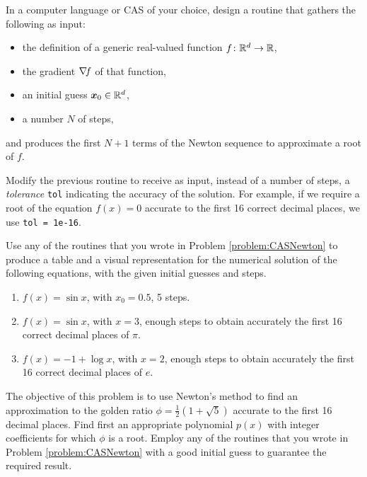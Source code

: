 \begin{problem}[CAS]\label{problem:CASNewton}
In a computer language or CAS of your choice, design a routine that gathers the following as input:
\begin{itemize}
\item the definition of a generic real-valued function $f\colon \mathbb{R}^d \to \mathbb{R}$, 
\item the gradient $\mathop{\nabla\! {f}}$ of that function,
\item an initial guess $\boldsymbol{x}_0 \in \mathbb{R}^d$, 
\item a number $N$ of steps,
\end{itemize}
and produces the first $N+1$ terms of the Newton sequence to approximate a root of $f$.

Modify the previous routine to receive as input, instead of a number of steps, a \emph{tolerance} \texttt{tol} indicating the accuracy of the solution.  For example, if we require a root of the equation $f(x)=0$ accurate to the first 16 correct decimal places, we use \texttt{tol = 1e-16}.
\end{problem}

\begin{problem}[CAS]
Use any of the routines that you wrote in Problem \ref{problem:CASNewton} to produce a table and a visual representation for the numerical solution of the following equations, with the given initial guesses and steps.
\begin{enumerate}
\item $f(x) = \sin x$, with $x_0=0.5$, 5 steps.
\item $f(x) = \sin x$, with $x=3$, enough steps to obtain accurately the first 16 correct decimal places of $\pi$.
\item $f(x) = -1+\log x$, with $x=2$, enough steps to obtain accurately the first 16 correct decimal places of $e$.
\end{enumerate}
\end{problem}

\begin{problem}[CAS]
The objective of this problem is to use Newton's method to find an approximation to the golden ratio $\phi=\frac{1}{2}(1+\sqrt{5})$ accurate to the first 16 decimal places.  Find first an appropriate polynomial $p(x)$ with integer coefficients for which $\phi$ is a root.  Employ any of the routines that you wrote in Problem \ref{problem:CASNewton} with a good initial guess to guarantee the required result.
\end{problem}


